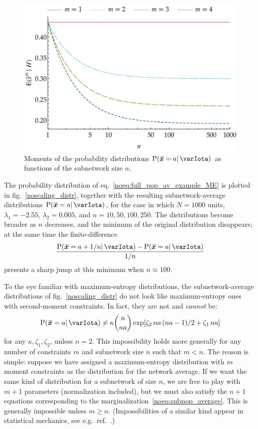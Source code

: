 \documentclass{article}
\theoremstyle{remark}
\theoremstyle{innote}
\newcommand*{\citep}{\parencites}
\renewcommand*{\|}{\mathpunct{|}}%
\renewcommand{\ge}{\geqslant}%
\newcommand*{\p}{\mathrm{P}}%
\newcommand*{\eqn}{eq.}%
\newcommand*{\fig}{fig.}%
\newcommand*{\eg}{{e.g.}}
\theoremstyle{simple}
\newcommand*{\widebar}[1]{{\mkern1.5mu\skew{2}\overline{\mkern-1.5mu#1\mkern-1.5mu}\mkern 1.5mu}}
\newcommand*{\sav}{\widebar} %
\newcommand*{\yxx}{x}%
\newcommand*{\yx}{\bm{\yxx}}%
\newcommand*{\yxs}{\sav{\yx}}%
\newcommand*{\yH}{\varIota}
\newcommand*{\yk}{\zeta}
\begin{document}
\begin{figure}[!b]
\centering
\includegraphics[width=0.95\columnwidth]{scaling_subpop_moments.pdf}%
\caption{Moments of the probability distributions $\p(\yxs =a \|
  \yH)$ as functions of the subnetwork size $n$.}
\label{noscaling_moments}
\end{figure}

The probability distribution of \eqn~\eqref{noeq:full_pop_av_example_ME} is
plotted in \fig~\ref{noscaling_distr}, together with the resulting
subnetwork-average distributions $\p(\yxs = a \|\yH)$, for the case in
which $N = 1000$ units, $\lambda_1=-2.55$, $\lambda_2=0.005$, and
$n=10, 50, 100, 250$. The distributions become broader as $n$ decreases,
and the minimum of the original distribution disappears; at the same time
the finite-difference 
\[\frac{\p(\yxs=a+1/n\|\yH)-\p(\yxs=a\|\yH)}{1/n}\]
presents a sharp jump at this minimum when $n\approx 100$.

To the eye familiar with maximum-entropy distributions, the
subnetwork-average distributions of \fig~\ref{noscaling_distr} do not look
like maximum-entropy ones with second-moment constraints. In fact,
they are not and \emph{cannot} be:
\begin{equation}
  \label{noeq:maxent_form_sub}
  \p(\yxs =a  \| \yH)
\ne\kappa\binom{n}{n a}\exp[\yk_2\, n a\,(n a-1)/2 + \yk_1\, n a]
\end{equation}
for any $\kappa, \yk_1, \yk_2$, unless $n=2$. This impossibility holds more
generally for any number of constraints $m$ and subnetwork size $n$ such
that $m<n$. The reason is simple: suppose we have assigned a
maximum-entropy distribution with $m$ moment constraints as the
distribution for the network average. If we want the same kind of
distribution for a subnetwork of size $n$, we are free to play with $m+1$
parameters (normalization included), but we must also satisfy the $n+1$
equations corresponding to the marginalization~\eqref{noeq:subpop_average}.
This is generally impossible unless $m \ge n$. (Impossibilities of a
similar kind appear in statistical mechanics, see \eg\
ref.~\citep{maesetal1999}.)
\end{document}
